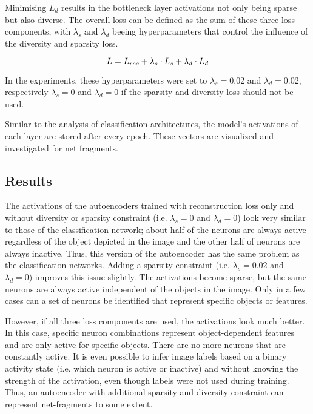 Minimising $L_{d}$ results in the bottleneck layer activations not only being sparse but also diverse. 
The overall loss can be defined as the sum of these three loss components, with $\lambda_s$ and $\lambda_d$ beeing hyperparameters that control the influence of the diversity and sparsity loss.

\begin{equation}\eqlbl{ae_kldl2}
		L = L_{rec} + \lambda_s \cdot L_{s} + \lambda_d \cdot L_{d}
\end{equation}

In the experiments, these hyperparameters were set to $\lambda_s = 0.02$ and $\lambda_d = 0.02$, respectively $\lambda_s = 0$ and $\lambda_d = 0$ if the sparsity and diversity loss should not be used.

Similar to the analysis of classification architectures, the model's activations of each layer are stored after every epoch.
These vectors are visualized and investigated for net fragments.

\subsection{Results}
The activations of the autoencoders trained with reconstruction loss only and without diversity or sparsity constraint (i.e. $\lambda_s = 0$ and $\lambda_d = 0$) look very similar to those of the classification network; about half of the neurons are always active regardless of the object depicted in the image and the other half of neurons are always inactive. Thus, this version of the autoencoder has the same problem as the classification networks. Adding a sparsity constraint (i.e. $\lambda_s = 0.02$ and $\lambda_d = 0$) improves this issue slightly. The activations become sparse, but the same neurons are always active independent of the objects in the image. Only in a few cases can a set of neurons be identified that represent specific objects or features.

However, if all three loss components are used, the activations look much better. In this case, specific neuron combinations represent object-dependent features and are only active for specific objects. There are no more neurons that are constantly active. It is even possible to infer image labels based on a binary activity state (i.e. which neuron is active or inactive) and without knowing the strength of the activation, even though labels were not used during training. Thus, an autoencoder with additional sparsity and diversity constraint can represent net-fragments to some extent.



